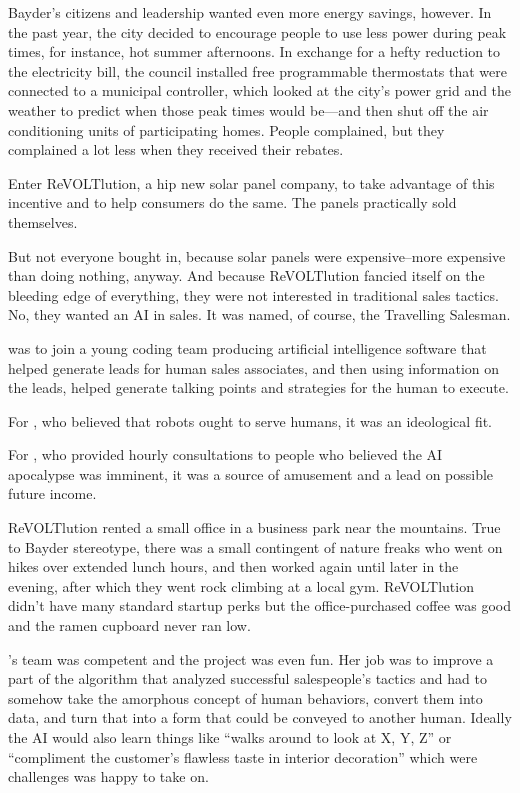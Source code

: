 Bayder's citizens and leadership wanted even more energy savings, however. In the past year, the city decided to encourage people to use less power during peak times, for instance, hot summer afternoons. In exchange for a hefty reduction to the electricity bill, the council installed free programmable thermostats that were connected to a municipal controller, which looked at the city's power grid and the weather to predict when those peak times would be---and then shut off the air conditioning units of participating homes. People complained, but they complained a lot less when they received their rebates.

Enter ReVOLTlution, a hip new solar panel company, to take advantage of this incentive and to help consumers do the same. The panels practically sold themselves.

But not everyone bought in, because solar panels were expensive--more expensive than doing nothing, anyway. And because ReVOLTlution fancied itself on the bleeding edge of everything, they were not interested in traditional sales tactics. No, they wanted an AI in sales. It was named, of course, the Travelling Salesman.

{\protag} was to join a young coding team producing artificial intelligence software that helped generate leads for human sales associates, and then using information on the leads, helped generate talking points and strategies for the human to execute.

For {\protag}, who believed that robots ought to serve humans, it was an ideological fit.

For {\sidetag}, who provided hourly consultations to people who believed the AI apocalypse was imminent, it was a source of amusement and a lead on possible future income.

\vspace{5mm}

ReVOLTlution rented a small office in a business park near the mountains. True to Bayder stereotype, there was a small contingent of nature freaks who went on hikes over extended lunch hours, and then worked again until later in the evening, after which they went rock climbing at a local gym. ReVOLTlution didn't have many standard startup perks but the office-purchased coffee was good and the ramen cupboard never ran low.

{\protag}’s team was competent and the project was even fun. Her job was to improve a part of the algorithm that analyzed successful salespeople's tactics and had to somehow take the amorphous concept of human behaviors, convert them into data, and turn that into a form that could be conveyed to another human. Ideally the AI would also learn things like ``walks around to look at X, Y, Z'' or ``compliment the customer's flawless taste in interior decoration'' which were challenges {\protag} was happy to take on.

